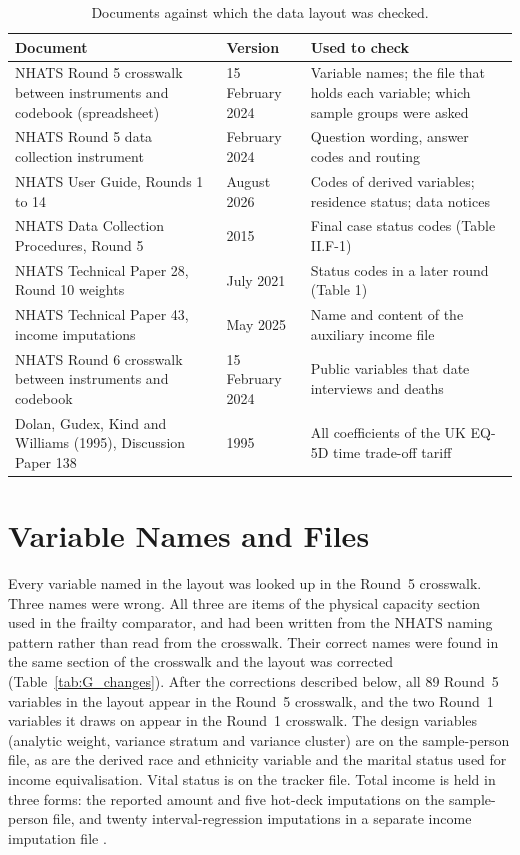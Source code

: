 \begin{table}[htbp]
\centering
\caption{Documents against which the data layout was checked.}
\label{tab:G_sources}
\footnotesize
\renewcommand{\arraystretch}{1.2}
\begin{tabular}{p{5.2cm} p{2.6cm} p{6.2cm}}
\toprule
\textbf{Document} & \textbf{Version} & \textbf{Used to check} \\
\midrule
NHATS Round 5 crosswalk between instruments and codebook (spreadsheet) & 15 February 2024 & Variable names; the file that holds each variable; which sample groups were asked \\
NHATS Round 5 data collection instrument & February 2024 & Question wording, answer codes and routing \\
NHATS User Guide, Rounds 1 to 14 & August 2026 & Codes of derived variables; residence status; data notices \\
NHATS Data Collection Procedures, Round 5 & 2015 & Final case status codes (Table II.F-1) \\
NHATS Technical Paper 28, Round 10 weights & July 2021 & Status codes in a later round (Table 1) \\
NHATS Technical Paper 43, income imputations & May 2025 & Name and content of the auxiliary income file \\
NHATS Round 6 crosswalk between instruments and codebook & 15 February 2024 & Public variables that date interviews and deaths \\
Dolan, Gudex, Kind and Williams (1995), Discussion Paper 138 & 1995 & All coefficients of the UK EQ-5D time trade-off tariff \\
\bottomrule
\end{tabular}
\end{table}

\section{Variable Names and Files}
\label{sec:G_names}

Every variable named in the layout was looked up in the Round~5 crosswalk.
Three names were wrong. All three are items of the physical capacity section
used in the frailty comparator, and had been written from the NHATS naming
pattern rather than read from the crosswalk. Their correct names were found in
the same section of the crosswalk and the layout was corrected
(Table~\ref{tab:G_changes}). After the corrections described below, all 89
Round~5 variables in the layout appear in the Round~5 crosswalk, and the two
Round~1 variables it draws on appear in the Round~1 crosswalk.
The design variables (analytic weight, variance stratum and variance cluster)
are on the sample-person file, as are the derived race and ethnicity variable
and the marital status used for income equivalisation. Vital status is on the
tracker file. Total income is held in three forms: the reported amount and
five hot-deck imputations on the sample-person file, and twenty
interval-regression imputations in a separate income imputation file
\citep{freedman_nhats_userguide_2026}.

